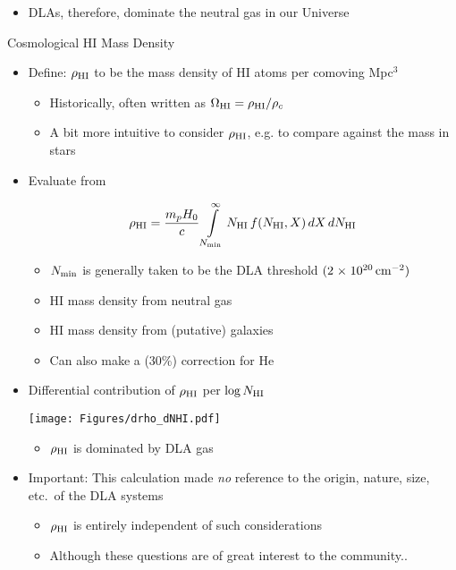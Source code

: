 \documentclass[12pt,letterpaper]{article}
\begin{document}
\begin{Aenumerate}
\begin{itemize}
\begin{itemize}
  \item DLAs, therefore, dominate the neutral gas in our Universe

    \end{itemize}

  \end{itemize}

{\bf \item Cosmological HI Mass Density}
  \begin{itemize}
  \item Define: $\rho_{\rm HI}$ to be the mass density of
  HI atoms per comoving Mpc$^3$
    \begin{itemize}
    \item Historically, often written as $\Omega_{\rm HI} = \rho_{\rm HI}/\rho_c$
    \item A bit more intuitive to consider $\rho_{\rm HI}$, e.g. to
    compare against the mass in stars
    \end{itemize}
  \item Evaluate from \fnhi

    \begin{equation}
    \rho_{\rm HI} = \frac{m_p H_0}{c} \int\limits_{N_{\rm min}}^\infty
    N_{\rm HI} \, f(N_{\rm HI}, X) \, dX \, dN_{\rm HI}
    \end{equation}

    \begin{itemize}
    \item $N_{\rm min}$ is generally taken to be the DLA threshold 
    $(2 {\; \times \; 10^{20}} \, {\rm cm^{-2}})$ 
    \item HI mass density from neutral gas
    \item HI mass density from (putative) galaxies
    \item Can also make a (30\%) correction for He
    \end{itemize}

  \item Differential contribution of $\rho_{\rm HI}$ per $\log N_{\rm HI}$

\texttt{[image: Figures/drho\_dNHI.pdf]}

    \begin{itemize}
    \item $\rho_{\rm HI}$ is dominated by DLA gas
    \end{itemize}

  \item Important: This calculation made {\it no} reference to the
  origin, nature, size, etc.\ of the DLA systems
    \begin{itemize}
    \item $\rho_{\rm HI}$ is entirely independent of such considerations
    \item Although these questions are of great interest to the community..
    \end{itemize}


\end{itemize}
\end{Aenumerate}
\end{document}
